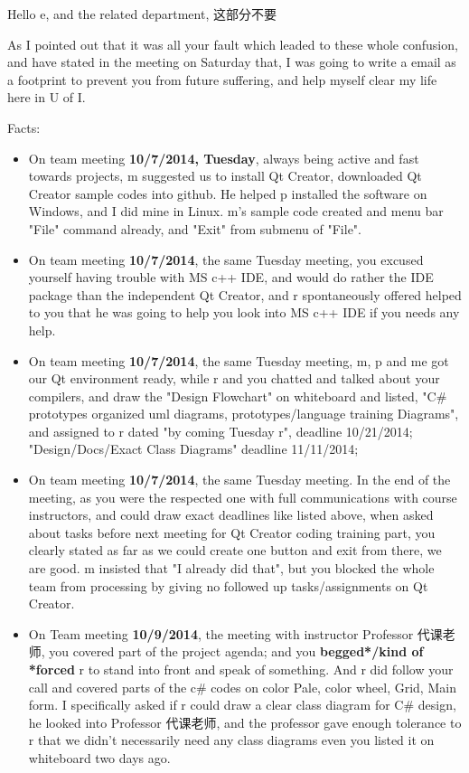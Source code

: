 \documentclass[9pt,b5paper]{article}
\begin{document}
Hello e, and the related department, 这部分不要

As I pointed out that it was all your fault which leaded to these whole confusion, and have stated in the meeting on Saturday that, I was going to write a email as a footprint to prevent you from future suffering, and help myself clear my life here in U of I. 

Facts:

\begin{itemize}
\item On team meeting \textbf{10/7/2014, Tuesday}, always being active and fast towards projects, m suggested us to install Qt Creator, downloaded Qt Creator sample codes into github. He helped p installed the software on Windows, and I did mine in Linux. m's sample code created and menu bar "File" command already, and "Exit" from submenu of "File".
\item On team meeting \textbf{10/7/2014}, the same Tuesday meeting, you excused yourself having trouble with MS c++ IDE, and would do rather the IDE package than the independent Qt Creator, and r spontaneously offered helped to you that he was going to help you look into MS c++ IDE if you needs any help.

\item On team meeting \textbf{10/7/2014}, the same Tuesday meeting, m, p and me got our Qt environment ready, while r and you chatted and talked about your compilers, and draw the "Design Flowchart" on whiteboard and listed, "C\# prototypes organized uml diagrams, prototypes/language training Diagrams", and assigned to r dated "by coming Tuesday r", deadline 10/21/2014; "Design/Docs/Exact Class Diagrams" deadline 11/11/2014;

\item On team meeting \textbf{10/7/2014}, the same Tuesday meeting. In the end of the meeting, as you were the respected one with full communications with course instructors, and could draw exact deadlines like listed above, when asked about tasks before next meeting for Qt Creator coding training part, you clearly stated as far as we could create one button and exit from there, we are good. m insisted that "I already did that", but you blocked the whole team from processing by giving no followed up tasks/assignments on Qt Creator.

\item On Team meeting \textbf{10/9/2014}, the meeting with instructor Professor 代课老师, you covered part of the project agenda; and you \textbf{begged*/kind of *forced} r to stand into front and speak of something. And r did follow your call and covered parts of the c\# codes on color Pale, color wheel, Grid, Main form. I specifically asked if r could draw a clear class diagram for C\# design, he looked into Professor 代课老师, and the professor gave enough tolerance to r that we didn't necessarily need any class diagrams even you listed it on whiteboard two days ago.


\end{itemize}
\end{document}
